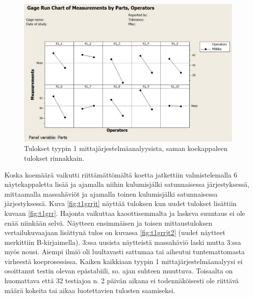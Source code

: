 \documentclass[12pt,a4paper,finnish]{tutthesis}
\begin{document}
\begin{figure}
  \begin{center}
    \includegraphics[width=1.0\textwidth]{t1grr2}
  \end{center}
  \caption[Rinnakkaiset tulokset tyypin 1 mittajärjestelmäanalyysista]{Tulokset tyypin 1 mittajärjestelmäanalyysista, saman koekappaleen tulokset rinnakkain.}
  \label{fig:t1grr2}
\end{figure}


Koska koemäärä vaikutti riittämättömältä koetta jatkettiin valmistelemalla 6 näytekappaletta lisää ja ajamalla niihin kulumisjälki satunnaisessa järjestyksessä, mittaamalla massahäviöt ja ajamalla toinen kulumisjälki satunnaisessa järjestyksessä.
Kuva \ref{fig:t1grrjt} näyttää tuloksen kun uudet tulokset lisättiin kuvaan \ref{fig:t1grr}.
Hajonta vaikuttaa kaoottisemmalta ja laskeva suuntaus ei ole enää niinkään selvä. Näytteen ensimmäisen ja toisen mittaustuloksen vertailukuvaajaan lisättynä
tulos on kuvassa \ref{fig:t1grrjt2} (uudet näytteet merkittiin B-kirjaimella). 3:ssa uusista näytteistä massahäviö laski mutta 3:ssa myös nousi.
Aiempi ilmiö oli luultavasti sattumaa tai aiheutui tuntemattomasta virheestä koeprosessissa. Kaiken kaikkiaan tyypin 1 mittajärjestelmäanalyysi ei osoittanut testin olevan epästabiili, so. ajan suhteen muuttuva. Toisaalta on huomattava että 32 testiajoa n. 2 päivän aikana ei todennäköisesti ole riittävä määrä kokeita tai aikaa luotettavien tulosten saamiseksi.
\end{document}
